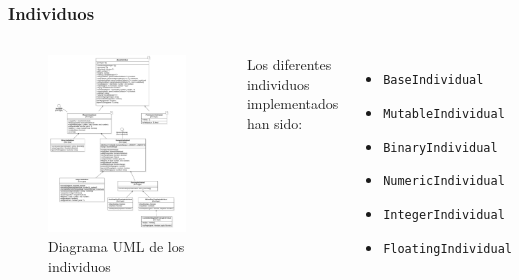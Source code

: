 \documentclass{beamer}
\begin{document}
\begin{frame}
\frametitle{Individuos}

\begin{columns}
    \begin{figure}
        \centering
        \includegraphics[scale=0.13]{mem/images/cap-4/4.2.2(Individuos)/Individual.png}
        \caption{Diagrama UML de los individuos}
        \label{fig:my_label}
    \end{figure}
    Los diferentes individuos implementados han sido:
    \begin{itemize}
        \item \texttt{BaseIndividual}
        \item \texttt{MutableIndividual}
        \item \texttt{BinaryIndividual}
        \item \texttt{NumericIndividual}
        \item \texttt{IntegerIndividual}
        \item \texttt{FloatingIndividual}
    \end{itemize}
\end{columns}

\end{frame}
\end{document}
